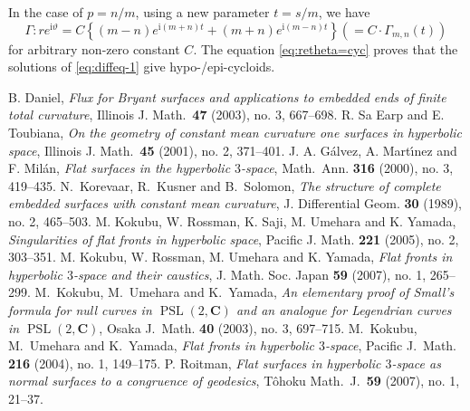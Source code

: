 \documentclass[a4paper]{amsart}
\theoremstyle{plain}
\theoremstyle{remark}
\numberwithin{equation}{section}
\begin{document}
In the case of $p=n/m$, using a new parameter $t=s/m$, we have 
\begin{equation}\label{eq:retheta=cyc}
 \varGamma \colon r e^{{\mathrm{i}} \vartheta}= 
  C \left\{ 
     (m-n) e^{{\mathrm{i}} (m+n)t} + (m+n) e^{ {\mathrm{i}} (m-n)t}
    \right\}
  \left( = C \cdot {\varGamma}_{m,n}(t) \right)
\end{equation}
for arbitrary non-zero constant $C$. 
The equation \eqref{eq:retheta=cyc} proves 
that the solutions of \eqref{eq:diffeq-1}
 give hypo-/epi-cycloids.

\begin{thebibliography}{KRSUY}
  B. Daniel, 
 {\em Flux for Bryant surfaces and applications to embedded ends of
	   finite total curvature},
 Illinois J. Math.\ {\bf 47} (2003), no. 3, 667--698.
  R. Sa Earp and E. Toubiana, 
  {\itshape On the geometry of constant mean curvature one surfaces in
            hyperbolic space}, 
 Illinois J. Math.\ {\bf 45} (2001), no. 2, 371--401.
  J. A. G\'alvez, A. Mart\'\i{}nez and F. Mil\'an,
  {\itshape Flat surfaces in the hyperbolic $3$-space},
  Math.\ Ann. {\bf 316} (2000), no. 3, 419--435.
  N.~Korevaar, R.~Kusner and B.~Solomon,
  {\it The structure of 
       complete embedded surfaces with constant mean curvature}, 
   J. Differential Geom. {\bf 30} (1989), no. 2, 465--503.
  M. Kokubu, W. Rossman, K. Saji, M. Umehara 
  and K. Yamada,
  {\itshape Singularities of flat fronts in hyperbolic space},
  Pacific J. Math. {\bf 221} (2005), no. 2, 303--351.
  M. Kokubu, W. Rossman, M. Umehara and K. Yamada,
  {\itshape 
 Flat fronts in hyperbolic $3$-space and their caustics},
  J. Math. Soc. Japan {\bf 59} (2007), no. 1, 265--299.
        M.\ Kokubu, M.\ Umehara and K.\ Yamada,
        {\itshape An elementary proof of Small's formula for null curves
        in {${\operatorname{PSL}}(2,{\boldsymbol{C}})$} and an analogue for Legendrian curves in
        {${\operatorname{PSL}}(2,{\boldsymbol{C}})$}},
        Osaka J.\ Math. {\bf 40} (2003), no. 3, 697--715.
        M.\ Kokubu, M.\ Umehara and K.\ Yamada,
        {\itshape Flat fronts  in hyperbolic $3$-space},
        Pacific J.\ Math. {\bf 216} (2004), no. 1, 149--175.
        P. Roitman,
        {\itshape Flat surfaces in hyperbolic $3$-space as normal surfaces
        to a congruence of geodesics},
        T\^ohoku Math.\ J.\ {\bfseries 59} (2007), no. 1,
	21--37.	

\end{thebibliography}
\end{document}
